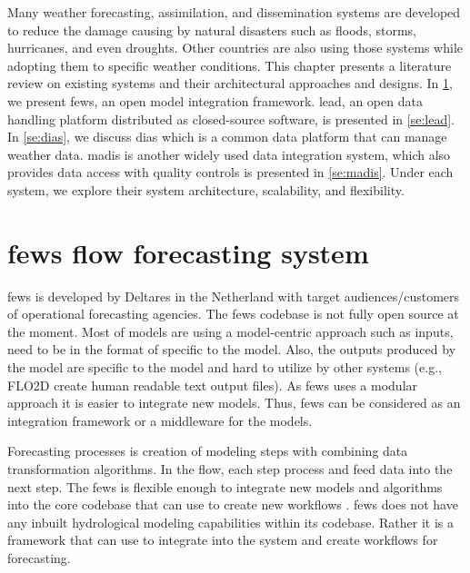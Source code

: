 Many weather forecasting, assimilation, and dissemination systems are developed to reduce the damage causing by natural disasters such as floods, storms, hurricanes, and even droughts.
Other countries are also using those systems while adopting them to specific weather conditions.
This chapter presents a literature review on existing systems and their architectural approaches and designs. In \cref{se:fews}, we present \acrfull{fews}, an open model integration framework. \acrfull{lead}, an open data handling platform distributed as closed-source software, is presented in \cref{se:lead}.
In \cref{se:dias}, we discuss \acrfull{dias} which is a common data platform that can manage weather data. \acrfull{madis} is another widely used data integration system, which also provides data access with quality controls is presented in \cref{se:madis}. Under each system, we explore their system architecture, scalability, and flexibility.


\section{\acrshort{fews} flow forecasting system}
\label{se:fews}

\acrshort{fews} \cite{Werner2013TheSystem} is developed by Deltares in the Netherland with target audiences/customers of operational forecasting agencies. The \acrshort{fews} codebase is not fully open source at the moment.
Most of models are using a model-centric approach such as inputs, need to be in the format of specific to the model. Also, the outputs produced by the model are specific to the model and hard to utilize by other systems (e.g., FLO2D create human readable text output files). As \acrshort{fews} uses a modular approach it is easier to integrate new models. 
Thus, \acrshort{fews} can be considered as an integration framework or a middleware for the models.

Forecasting processes is creation of modeling steps with combining data transformation algorithms. In the flow, each step process and feed data into the next step. The \acrshort{fews} is flexible enough to integrate new models and algorithms into the core codebase that can use to create new workflows \cite{Werner2013TheSystem}. \acrshort{fews} does not have any inbuilt hydrological modeling capabilities within its codebase. Rather it is a framework that can use to integrate into the system and create workflows for forecasting.

